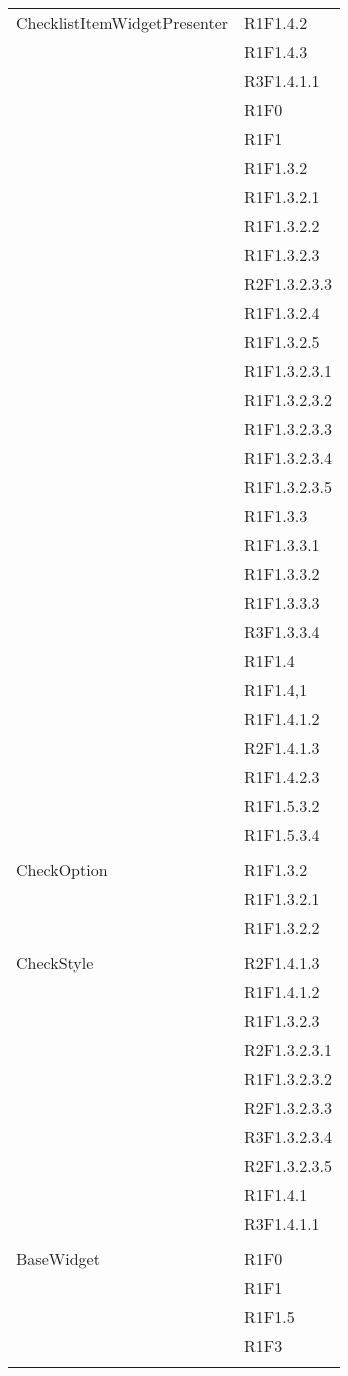 \begin{center}
\begin{longtable}{|p{7cm}|p{7cm}|}
		ChecklistItemWidgetPresenter & R1F1.4.2 \\ & R1F1.4.3 \\ & R3F1.4.1.1 \\ & R1F0 \\ & R1F1 \\ & R1F1.3.2 \\ & R1F1.3.2.1 \\ & R1F1.3.2.2 \\ & R1F1.3.2.3 \\ & R2F1.3.2.3.3 \\ & R1F1.3.2.4 \\ & R1F1.3.2.5 \\ & R1F1.3.2.3.1 \\ & R1F1.3.2.3.2 \\ & R1F1.3.2.3.3 \\ & R1F1.3.2.3.4 \\ & R1F1.3.2.3.5 \\ & R1F1.3.3 \\ & R1F1.3.3.1 \\ & R1F1.3.3.2 \\ & R1F1.3.3.3 \\ & R3F1.3.3.4 \\ & R1F1.4 \\ & R1F1.4,1 \\ & R1F1.4.1.2 \\ & R2F1.4.1.3 \\ & R1F1.4.2.3 \\ & R1F1.5.3.2 \\ & R1F1.5.3.4 \\ & \\ \hline
		CheckOption & R1F1.3.2 \\ & R1F1.3.2.1 \\ & R1F1.3.2.2 \\ & \\ \hline
		CheckStyle & R2F1.4.1.3 \\ & R1F1.4.1.2 \\ & R1F1.3.2.3 \\ & R2F1.3.2.3.1 \\ & R1F1.3.2.3.2 \\ & R2F1.3.2.3.3 \\ & R3F1.3.2.3.4 \\ & R2F1.3.2.3.5 \\ & R1F1.4.1 \\ & R3F1.4.1.1 \\ & \\ \hline
		BaseWidget & R1F0 \\ & R1F1 \\ & R1F1.5 \\ & R1F3 \\ & \\ \hline

\end{longtable}
\end{center}
